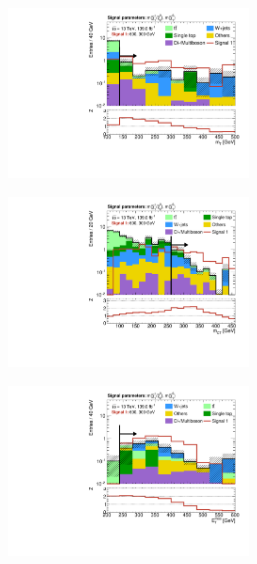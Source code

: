 \begin{figure}
	\centering
	\begin{subfigure}[b]{0.5\linewidth}
		\centering\includegraphics[width=0.7\textwidth]{N-1_cut_scan/n1_600_300/mt}
		\caption{}
	\end{subfigure}\hfill
	\begin{subfigure}[b]{0.5\linewidth}
		\centering\includegraphics[width=0.7\textwidth]{N-1_cut_scan/n1_600_300/mct}
		\caption{}
	\end{subfigure}\hfill
	\begin{subfigure}[b]{0.5\linewidth}
		\centering\includegraphics[width=0.7\textwidth]{N-1_cut_scan/n1_600_300/met}

\end{subfigure}
\end{figure}
